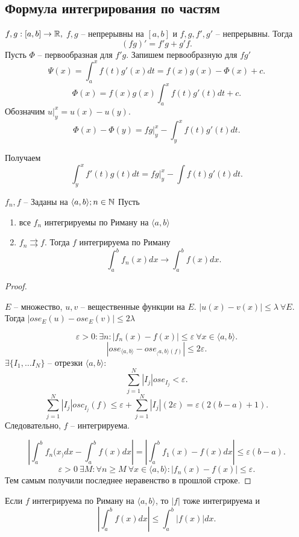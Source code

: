 \documentclass[12pt]{report}
\begin{document}
\subsection{Формула интегрирования по частям}
$ f, g : [a, b] \to  \mathbb{R}, $ $ f, g$ -- непрерывны на $ [a, b]$ и $ f, g, f', g'$ -- непрерывны.
Тогда \[
    (fg)' = f' g+g'f
.\] 
Пусть $ \Phi$ -- первообразная для $ f' g$.
Запишем первообразную для $ fg'$
\[
    \Psi (x) = \int_a^{x} f(t) g'(x) dt = f(x) g(x) - \Phi (x) + c
.\] 
\[
    \Phi (x) = f(x) g(x) \int_a^{x} f(t) g'(t) dt + c
.\] 
Обозначим $ u |_y^{x} = u(x) - u(y)$.
\[
    \Phi (x) - \Phi(y) = fg |_y^{x} - \int_y^{x} f(t)g'(t)dt
.\] 

Получаем
\[
    \int_y^{x} f'(t) g(t) dt = fg |_y^{x} - \int f(t) g'(t) dt
.\] 
\begin{thm}
    $ f_n, f$ -- Заданы на $ \langle a, b \rangle; n \in \mathbb{N}$
    Пусть 
    \begin{enumerate}
	\item все $ f_n$ интегрируемы по Риману на $ \langle a, b \rangle$
	\item $ f_n \rightrightarrows f$. Тогда  $ f$ интегрируема по Риману
	    \[
		\int_a^{b}f_n(x) dx \to \int_a^{b}f(x) dx
	    .\] 
    \end{enumerate}
\end{thm}
\begin{proof}
    \begin{lm}
	$ E$ -- множество, $ u, v $ -- вещественные функции на $ E$. $ |u(x) - v(x) | \le  \lambda ~ \forall  E.$
	Тогда $ |ose_E(u) - ose_E(v) | \le  2 \lambda$
    \end{lm}
    \[
	\varepsilon  >0: \exists  n: |f_n(x) - f(x)| \le \varepsilon ~ \forall x \in  \langle a, b \rangle
    .\] 
    \[
	|ose_{\langle a, b \rangle} - ose_{_\langle a, b \rangle(f)}| \le 2 \varepsilon 
    .\] 
    $\exists  \{I_1, \ldots I_N \} $ -- отрезки $ \langle  a, b \rangle$:
    \[
	\sum_{j=1}^{N }|I_j| ose_{I_j} < \varepsilon 
    .\] 
    \[
	\sum_{j=1}^{N} |I_j| osc_{I_j}(f)  \le  \varepsilon +\sum_{j=1}^{N} |I_j| (2 \varepsilon ) = \varepsilon (2 (b-a) + 1)
    .\] 
    Следовательно, $ f$ -- интегрируема.

    \[
	\left|\int_a^{b} f_n(x_) dx - \int _a^{b}f(x) dx \right|= \left|\int_a^{b} f_1(x) - f(x) dx\right| \le  \varepsilon (b-a)
    .\] 
    \[
	\varepsilon  >0  ~ \exists M : \forall n \ge M ~ \forall  x \in  \langle a, b \rangle: |f_n(x) - f(x) | \le  \varepsilon 
    .\] 
    Тем самым получили последнее неравенство в прошлой строке.
\end{proof}
\begin{st}
    Если $ f$ интегрируема по Риману на $ \langle  a,b \rangle$, то $ |f|$ тоже интегрируема и \[
	\left |\int_a ^{b} f(x) dx\right| \le  \int_a^{b} |f(x) |dx
    .\] 
\end{st}
\end{document}
